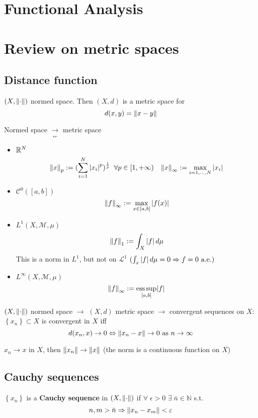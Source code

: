 \newpage
\section*{Functional Analysis}
\section{Review on metric spaces}
\subsection{Distance function}
\begin{proposition}
    \((X, \norm{\cdot})\) normed space. Then \((X, d)\) is a metric space for 
    \[
        d(x,y) = \norm{x - y}
    \]
\end{proposition}
\begin{remark}
    Normed space \(\underset{\displaystyle\nleftarrow}{\rightarrow}\) metric space
\end{remark}
\begin{example}
    \begin{itemize}
        \item \(\mathbb{R}^N\)
        \[
            \norm{x}_p := (\sum_{i = 1}^N \abs{x_i}^p)^{\frac{1}{p}} \; \; \forall p \in [1, +\infty) \quad
            \norm{x}_{\infty} := \max_{i = 1, \ldots, N} \abs{x_i}
        \]
        \item \(\mathcal{C}^0([a,b])\) \[\norm{f}_{\infty} := \max_{x \in [a,b]} \abs{f(x)}\]
        \item \(L^1(X, \mathcal{M}, \mu)\) \[\norm{f}_1 := \int_X \abs{f} \, d\mu\] This is a norm in \(L^1\), but not on \(\mathcal{L}^1\) \((\int_x \abs{f} \, d\mu = 0 \Rightarrow f = 0 \mbox{ a.e.})\)
        \item \(L^{\infty}(X, \mathcal{M}, \mu)\) \[\norm{f}_{\infty} := \underset{[a,b]}{\text{ess}\, \text{sup}} \abs{f}\]
    \end{itemize}
\end{example}
\((X, \norm{\cdot})\) normed space \(\to\) \((X, d)\) metric space \(\to\) convergent sequences on \(X\): \(\left\{ x_n \right\} \subset X\) is convergent in \(X\) iff 
\[
    d(x_n, x) \to 0 \Leftrightarrow \norm{x_n -x} \to 0 \mbox{ as } n \to \infty
\]
\begin{example}
    \(x_n \to x\) in \(X\), then \(\norm{x_n} \to \norm{x}\) (the norm is a continuous function on \(X\))
\end{example}\subsection{Cauchy sequences}
\begin{definition}
    \(\left\{ x_n \right\}\) is a \textbf{Cauchy sequence} in \((X, \norm{\cdot})\) if \(\forall \; \epsilon > 0\) \(\exists \; \bar{n} \in \mathbb{N}\) s.t. 
    \[
        n,m > \bar{n} \Rightarrow \norm{x_n-x_m} < \varepsilon
    \]
\end{definition}
